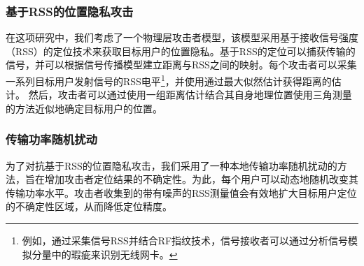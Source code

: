 \subsubsection{基于RSS的位置隐私攻击}
在这项研究中，我们考虑了一个物理层攻击者模型，该模型采用基于接收信号强度（RSS）的定位技术来获取目标用户的位置隐私。基于RSS的定位可以捕获传输的信号，并可以根据信号传播模型\cite{Jiang07,EI10}建立距离与RSS之间的映射。每个攻击者可以采集一系列目标用户发射信号的RSS电平\footnote{例如，通过采集信号RSS并结合RF指纹技术\cite{TIEYuanchao}，信号接收者可以通过分析信号模拟分量中的瑕疵来识别无线网卡。}，并使用通过最大似然估计\cite{RSSguang}获得距离的估计。
然后，攻击者可以通过使用一组距离估计结合其自身地理位置使用三角测量的方法近似地确定目标用户的位置。


\subsubsection{传输功率随机扰动}
为了对抗基于RSS的位置隐私攻击，我们采用了一种本地传输功率随机扰动的方法，旨在增加攻击者定位结果的不确定性\cite{EI10}。为此，每个用户可以动态地随机改变其传输功率水平。攻击者收集到的带有噪声的RSS测量值会有效地扩大目标用户定位的不确定性区域，从而降低定位精度。

